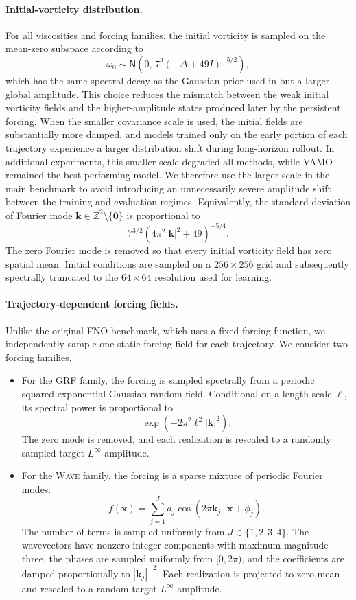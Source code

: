 \documentclass[11pt]{article}
\begin{document}
\paragraph{Initial-vorticity distribution.}
For all viscosities and forcing families, the initial vorticity is sampled on the mean-zero subspace according to
\[
    \omega_0
    \sim
    \mathsf{N}\left(
        0,\,
        7^3(-\Delta+49I)^{-5/2}
    \right),
\]
which has the same spectral decay as the Gaussian prior used in \citep{li2020fourier} but a larger global amplitude. This choice reduces the mismatch between the weak initial vorticity fields and the higher-amplitude states produced later by the persistent forcing. When the smaller covariance scale is used, the initial fields are substantially more damped, and models trained only on the early portion of each trajectory experience a larger distribution shift during long-horizon rollout. In additional experiments, this smaller scale degraded all methods, while VAMO remained the best-performing model. We therefore use the larger scale in the main benchmark to avoid introducing an unnecessarily severe amplitude shift between the training and evaluation regimes. Equivalently, the standard deviation of Fourier mode
$\mathbf{k}\in\mathbb{Z}^2\setminus\{\mathbf{0}\}$ is proportional to
\[
    7^{3/2}
    \left(
        4\pi^2|\mathbf{k}|^2+49
    \right)^{-5/4}.
\]
The zero Fourier mode is removed so that every initial vorticity field has zero spatial mean. Initial conditions are sampled on a $256\times256$ grid and subsequently spectrally truncated to the $64\times64$ resolution used for learning.

\paragraph{Trajectory-dependent forcing fields.}
Unlike the original FNO benchmark, which uses a fixed forcing function, we independently sample one static forcing field for each trajectory. We consider two forcing families.
\begin{itemize}[topsep=0pt, itemsep=0pt]
\item For the \textsc{GRF} family, the forcing is sampled spectrally from a periodic squared-exponential Gaussian random field. Conditional on a length scale $\ell$, its spectral power is proportional to
\[
    \exp\left(
        -2\pi^2\ell^2|\mathbf{k}|^2
    \right).
\]
The zero mode is removed, and each realization is rescaled to a randomly sampled target $L^\infty$ amplitude.

\item For the \textsc{Wave} family, the forcing is a sparse mixture of periodic
Fourier modes:
\[
    f(\mathbf{x})
    =
    \sum_{j=1}^{J}
    a_j
    \cos\left(
        2\pi\mathbf{k}_j\cdot\mathbf{x}
        +
        \phi_j
    \right).
\]
The number of terms is sampled uniformly from $J\in\{1,2,3,4\}$. The wavevectors have nonzero integer components with maximum magnitude three, the phases are sampled uniformly from $[0,2\pi)$, and the coefficients are damped proportionally to $|\mathbf{k}_j|^{-2}$. Each realization is projected to zero mean and rescaled to a random target $L^\infty$ amplitude.
\end{itemize}
\end{document}
